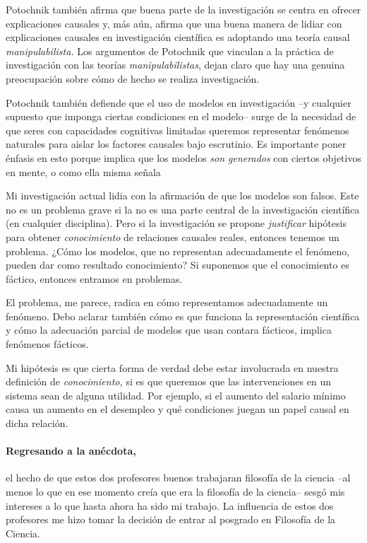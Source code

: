 Potochnik también afirma que buena parte de la investigación se centra en ofrecer explicaciones causales y, más aún, afirma que una buena manera de lidiar con explicaciones causales en investigación científica es adoptando una teoría causal \emph{manipulabilista.} 
Los argumentos de Potochnik que vinculan a la práctica de investigación con las teorías \emph{manipulabilistas}, dejan claro que hay una genuina preocupación sobre cómo de hecho se realiza investigación.

Potochnik también defiende que el uso de modelos en investigación --y cualquier supuesto que imponga ciertas condiciones en el modelo-- surge de la necesidad de que seres con capacidades cognitivas limitadas queremos representar fenómenos naturales para aislar los factores causales bajo escrutinio. 
Es importante poner énfasis en esto porque implica que los modelos \emph{son generados} con ciertos objetivos en mente, o como ella misma señala  

Mi investigación actual lidia con la afirmación de que los modelos son falsos. 
Este no es un problema grave si la  no es una parte central de la investigación científica (en cualquier disciplina). 
Pero si la investigación se propone \emph{justificar} hipótesis para obtener \emph{conocimiento} de relaciones causales reales, entonces tenemos un problema.
¿Cómo los modelos, que no representan adecuadamente el fenómeno, pueden dar como resultado conocimiento?
Si suponemos que el conocimiento es fáctico, entonces entramos en problemas.

El problema, me parece, radica en cómo representamos adecuadamente un fenómeno. 
Debo aclarar también cómo es que funciona la representación científica y cómo la adecuación parcial de modelos que usan contara fácticos, implica fenómenos fácticos.

Mi hipótesis es que cierta forma de verdad debe estar involucrada en nuestra definición de \emph{conocimiento,} si es que queremos que las intervenciones en un sistema sean de alguna utilidad. 
Por ejemplo, si el aumento del salario mínimo causa un aumento en el desempleo y qué condiciones juegan un papel causal en dicha relación.

\paragraph{Regresando a la anécdota,} el hecho de que estos dos profesores buenos trabajaran filosofía de la
ciencia --al menos lo que en ese momento creía que era la filosofía de la ciencia-- sesgó mis intereses a lo que hasta ahora ha sido mi trabajo.
La influencia de estos dos profesores me hizo tomar la decisión de entrar al posgrado en Filosofía de la Ciencia.

